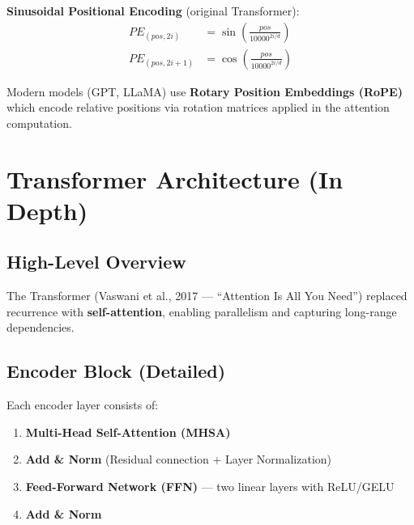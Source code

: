 \documentclass[11pt,a4paper]{article}
\begin{document}
\textbf{Sinusoidal Positional Encoding} (original Transformer):
\begin{align}
PE_{(pos, 2i)}   &= \sin\!\left(\frac{pos}{10000^{2i/d}}\right) \\
PE_{(pos, 2i+1)} &= \cos\!\left(\frac{pos}{10000^{2i/d}}\right)
\end{align}

Modern models (GPT, LLaMA) use \textbf{Rotary Position Embeddings (RoPE)} which encode relative positions via rotation matrices applied in the attention computation.

\section{Transformer Architecture (In Depth)}

\subsection{High-Level Overview}
The Transformer (Vaswani et al., 2017 --- ``Attention Is All You Need'') replaced recurrence with \textbf{self-attention}, enabling parallelism and capturing long-range dependencies.

\begin{center}
\end{center}

\subsection{Encoder Block (Detailed)}
Each encoder layer consists of:
\begin{enumerate}[nosep]
  \item \textbf{Multi-Head Self-Attention (MHSA)}
  \item \textbf{Add \& Norm} (Residual connection + Layer Normalization)
  \item \textbf{Feed-Forward Network (FFN)} --- two linear layers with ReLU/GELU
  \item \textbf{Add \& Norm}
\end{enumerate}
\end{document}
